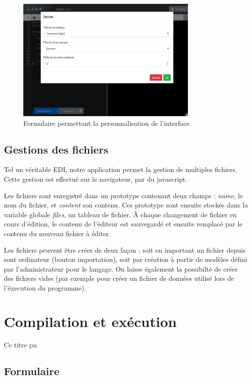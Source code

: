 \begin{figure}[!h]
\centering
\includegraphics[width=0.8\textwidth]{./img/frontend/example_personnalisation.png}
\caption{Formulaire permettant la personnalisation de l'interface}
\end{figure}

\subsection{Gestions des fichiers}
Tel un véritable EDI, notre application permet la gestion de multiples fichiers. Cette gestion est effectué sur le navigateur, par du javascript.

Les fichiers sont enregistré dans un prototype contenant deux champs : \emph{name}, le nom du fichier, et \emph{content} son contenu. Ces prototype sont ensuite stockés dans la variable
globale \emph{files}, un tableau de fichier. À chaque changement de fichier en cours d'édition, le contenu de l'éditeur est sauvegardé et ensuite remplacé par le contenu du nouveau fichier à éditer.

Les fichiers peuvent être créer de deux façon : soit en important un fichier depuis sont ordinateur (bouton importation), soit par création à partir de modèles défini par l'administrateur pour le langage.
On laisse également la possibilté de créer des fichiers vides (par exemple pour créer un fichier de données utilisé lors de l'éxecution du programme).


\section{Compilation et exécution}
Ce titre pu

\subsection{Formulaire}

